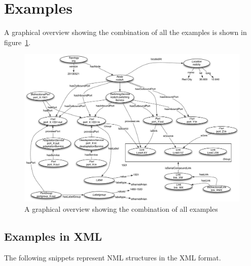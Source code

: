 

\section{Examples}%
\label{s:examples}

A graphical overview showing the combination of all the examples is shown in figure~\ref{fig:combined-examples}.

\begin{figure}[hp!]
    \centering
        \includegraphics[width=\textwidth,angle=90]{combined-examples.pdf}
    \caption{A graphical overview showing the combination of all examples}
    \label{fig:combined-examples}
\end{figure}

\subsection{Examples in XML}
The following snippets represent NML structures in the XML format.

